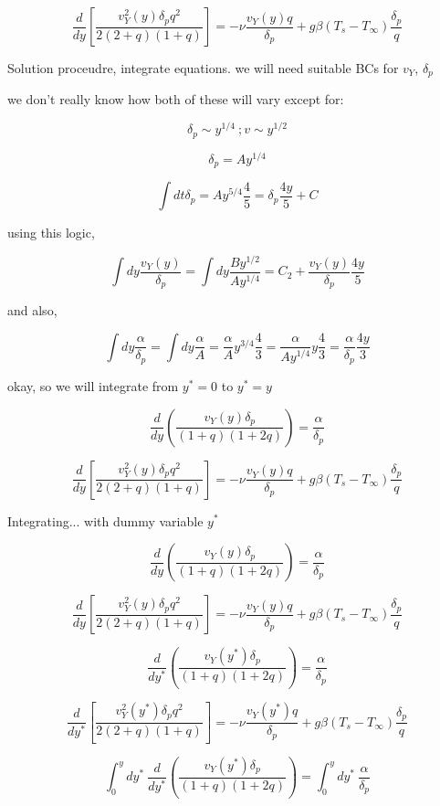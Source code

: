 \documentclass[11pt]{article}
\begin{document}
$$\frac{d}{dy} \left[  \frac{v_Y^2 (y) \delta_p q^2  }{2(2+q)(1+ q)} \right] = - \nu  \frac{ v_Y (y) q}{\delta_p} + g\beta  (T_s -T_\infty) \frac{\delta_p}{q}$$

Solution proceudre, integrate equations. we will need suitable BCs for $v_Y$, $\delta_p$ 

we don't really know how both of these will vary except for:

$$\delta_p \sim y^{1/4} \ ; v \sim y^{1/2}$$

$$\delta_p = A y^{1/4}$$

$$\int dt \delta_p = A y^{5/4} \frac{4}{5}= \delta_p \frac{4y}{5}+C$$

using this logic,

$$\int dy \frac{v_Y(y)}{\delta_p} =\int dy \frac{B y^{1/2}}{A y^{1/4}} =  C_2 + \frac{v_Y(y)}{\delta_p} \frac{4y}{5}$$


and also,

$$\int dy \frac{\alpha}{\delta_p} = \int dy \frac{\alpha}{A } = \frac{\alpha}{A} y^{3/4} \frac{4}{3} =  \frac{\alpha}{A y^{1/4}} y  \frac{4}{3} = \frac{\alpha}{\delta_p} \frac{4y}{3} $$

okay, so we will integrate from $y^*=0$ to $y^*=y$


$$ \frac{d}{dy}  ( \frac{ v_Y (y) \delta_p}{(1 + q)(1+2q)}  ) =  \frac{\alpha}{\delta_p}$$


$$\frac{d}{dy} \left[  \frac{v_Y^2 (y) \delta_p q^2  }{2(2+q)(1+ q)} \right] = - \nu  \frac{ v_Y (y) q}{\delta_p} + g\beta  (T_s -T_\infty) \frac{\delta_p}{q}$$

Integrating... with dummy variable $y^*$


$$ \frac{d}{dy}  ( \frac{ v_Y (y) \delta_p}{(1 + q)(1+2q)}  ) =  \frac{\alpha}{\delta_p}$$


$$\frac{d}{dy} \left[  \frac{v_Y^2 (y) \delta_p q^2  }{2(2+q)(1+ q)} \right] = - \nu  \frac{ v_Y (y) q}{\delta_p} + g\beta  (T_s -T_\infty) \frac{\delta_p}{q}$$


$$ \frac{d}{dy^*}  ( \frac{ v_Y (y^*) \delta_p}{(1 + q)(1+2q)}  ) =  \frac{\alpha}{\delta_p}$$


$$\frac{d}{dy^*} \left[  \frac{v_Y^2 (y^*) \delta_p q^2  }{2(2+q)(1+ q)} \right] = - \nu  \frac{ v_Y (y^*) q}{\delta_p} + g\beta  (T_s -T_\infty) \frac{\delta_p}{q}$$



$$ \int_0^y dy^* \  \frac{d}{dy^*}  ( \frac{ v_Y (y^*) \delta_p}{(1 + q)(1+2q)}  ) =  \int_0^y dy^* \ \frac{\alpha}{\delta_p}$$
\end{document}
